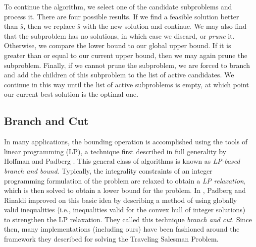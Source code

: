 To continue the algorithm, we select one of the candidate subproblems
and process it. There are four possible results. If we find a feasible
solution better than $\hat{s}$, then we replace $\hat{s}$ with the new
solution and continue. We may also find that the subproblem has no
solutions, in which case we discard, or {\em prune} it. Otherwise, we
compare the lower bound to our global upper bound. If it is greater
than or equal to our current upper bound, then we may again prune the
subproblem. Finally, if we cannot prune the subproblem, we are forced
to branch and add the children of this subproblem to the list of
active candidates. We continue in this way until the list of active
subproblems is empty, at which point our current best solution is the
optimal one.

\subsection{Branch and Cut}
\label{branchandcut}

In many applications, the bounding operation is accomplished using the
tools of linear programming (LP), a technique first described in full
generality by Hoffman and Padberg \cite{hoff:LP}. This general class of
algorithms is known as {\em LP-based branch and bound}. Typically, the
integrality constraints of an integer programming formulation of the
problem are relaxed to obtain a {\em LP relaxation}, which is then
solved to obtain a lower bound for the problem. In \cite{padb:branc},
Padberg and Rinaldi improved on this basic idea by describing a method
of using globally valid inequalities (i.e., inequalities valid for the
convex hull of integer solutions) to strengthen the LP relaxation.
They called this technique {\em branch and cut}. Since then, many
implementations (including ours) have been fashioned around the
framework they described for solving the Traveling Salesman Problem.

